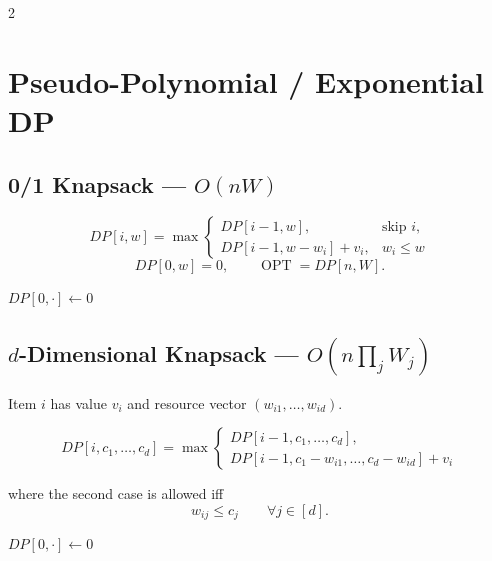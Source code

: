 \documentclass[8pt]{extarticle}
\theoremstyle{definition}
\newcommand{\OPT}{\operatorname{OPT}}
\begin{document}
\begin{multicols*}{2}
\section{Pseudo-Polynomial / Exponential DP}

\subsection{0/1 Knapsack --- $O(nW)$}

\[
DP[i,w]
=
\max\left\{
\begin{array}{ll}
DP[i-1,w], & \text{skip }i,\\
DP[i-1,w-w_i]+v_i, & w_i\le w
\end{array}
\right.
\]
\[
DP[0,w]=0,\qquad \OPT=DP[n,W].
\]

\begin{algorithm}[H]
\DontPrintSemicolon
{}
$DP[0,\cdot]\gets 0$\;
\;
\end{algorithm}


\subsection{$d$-Dimensional Knapsack --- $O(n\prod_j W_j)$}

Item $i$ has value $v_i$ and resource vector
$(w_{i1},\dots,w_{id})$.

\[
DP[i,c_1,\dots,c_d]
=
\max\left\{
\begin{array}{l}
DP[i-1,c_1,\dots,c_d],\\
DP[i-1,c_1-w_{i1},\dots,c_d-w_{id}]+v_i
\end{array}
\right.
\]

where the second case is allowed iff
\[
w_{ij}\le c_j\qquad\forall j\in[d].
\]

\begin{algorithm}[H]
\DontPrintSemicolon
{}
$DP[0,\cdot]\gets 0$\;
\;
\end{algorithm}



\end{multicols*}
\end{document}
